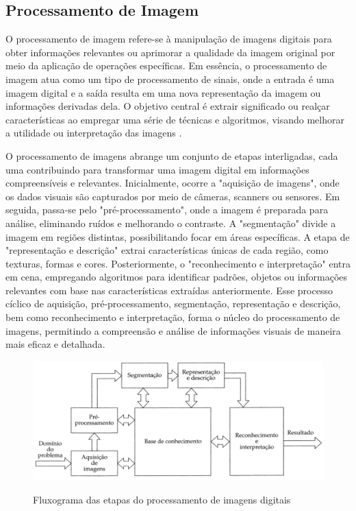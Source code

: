\subsection[Processamento de Imagem]{Processamento de Imagem}

O processamento de imagem refere-se à manipulação de imagens digitais para obter informações relevantes ou aprimorar a qualidade da imagem original por meio da aplicação de operações específicas. Em essência, o processamento de imagem atua como um tipo de processamento de sinais, onde a entrada é uma imagem digital e a saída resulta em uma nova representação da imagem ou informações derivadas dela. O objetivo central é extrair significado ou realçar características ao empregar uma série de técnicas e algoritmos, visando melhorar a utilidade ou interpretação das imagens \cite{imagemIBM}.

O processamento de imagens abrange um conjunto de etapas interligadas, cada uma contribuindo para transformar uma imagem digital em informações compreensíveis e relevantes. Inicialmente, ocorre a "aquisição de imagens", onde os dados visuais são capturados por meio de câmeras, scanners ou sensores. Em seguida, passa-se pelo "pré-processamento", onde a imagem é preparada para análise, eliminando ruídos e melhorando o contraste. A "segmentação" divide a imagem em regiões distintas, possibilitando focar em áreas específicas. A etapa de "representação e descrição" extrai características únicas de cada região, como texturas, formas e cores. Posteriormente, o "reconhecimento e interpretação" entra em cena, empregando algoritmos para identificar padrões, objetos ou informações relevantes com base nas características extraídas anteriormente. Esse processo cíclico de aquisição, pré-processamento, segmentação, representação e descrição, bem como reconhecimento e interpretação, forma o núcleo do processamento de imagens, permitindo a compreensão e análise de informações visuais de maneira mais eficaz e detalhada\cite{imagemMonocromatica}.


\begin{figure}[!htb]
	\centering
    \caption{Fluxograma das etapas do processamento de imagens digitais}
	\includegraphics[scale=0.4]{figuras/processamento_imagem/ProcessamentoImagem.png}
	\label{fig:Fluxograma das etapas do processamento de imagens digitais}
\end{figure}




